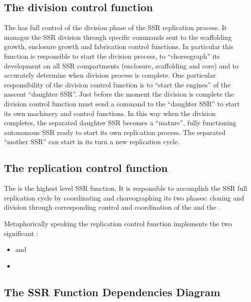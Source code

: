 \subsection[The division control function]{The division control
function}

The  has full control of the division phase of the SSR replication
process. It manages the SSR division through specific commands sent to
the scaffolding growth, enclosure growth and fabrication control
functions.  In particular this function is responsible to start the
division process, to “choreograph” its development on all SSR
compartments (enclosure, scaffolding and core) and to accurately
determine when division process is complete. One particular
responsibility of the division control function is to “start the
engines” of the nascent “daughter SSR”. Just before the moment the
division is complete the division control function must send a command
to the “daughter SSR” to start its own machinery and control functions.
In this way when the division completes, the separated daughter SSR
becomes a “mature”, fully functioning autonomous SSR ready to start its
own replication process. The separated “mother SSR” can start in its
turn a new replication cycle.

\subsection[The replication control function]{The replication control
function}

The  is the highest level SSR function. It is responsible to
accomplish the SSR full replication cycle by coordinating and
choreographing its two phases: cloning and division through
corresponding control and coordination of the  
and the .

Metaphorically speaking the replication control function implements the
two significant :

\begin{itemize}
\item {} and
\item {}
\end{itemize}

\subsection[The SSR Function Dependencies Diagram]{The SSR Function
Dependencies Diagram}

